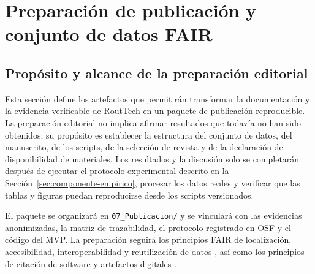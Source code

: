 \documentclass[12pt,a4paper]{article}
\begin{document}
\section{Preparación de publicación y conjunto de datos FAIR}

\subsection{Propósito y alcance de la preparación editorial}

Esta sección define los artefactos que permitirán transformar la documentación y la evidencia verificable de RoutTech en un paquete de publicación reproducible. La preparación editorial no implica afirmar resultados que todavía no han sido obtenidos; su propósito es establecer la estructura del conjunto de datos, del manuscrito, de los scripts, de la selección de revista y de la declaración de disponibilidad de materiales. Los resultados y la discusión solo se completarán después de ejecutar el protocolo experimental descrito en la Sección~\ref{sec:componente-empirico}, procesar los datos reales y verificar que las tablas y figuras puedan reproducirse desde los scripts versionados.

El paquete se organizará en \nolinkurl{07_Publicacion/} y se vinculará con las evidencias anonimizadas, la matriz de trazabilidad, el protocolo registrado en OSF y el código del MVP. La preparación seguirá los principios FAIR de localización, accesibilidad, interoperabilidad y reutilización de datos \cite{wilkinson2016}, así como los principios de citación de software y artefactos digitales \cite{smith2016,druskat2021}.
\end{document}
